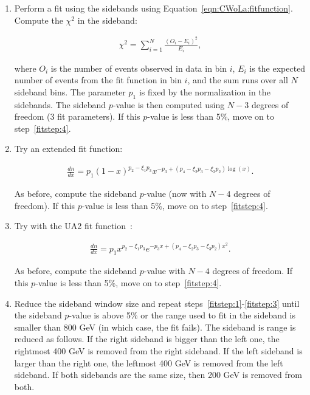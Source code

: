 \begin{enumerate}
  \item \label{fitstep:1} Perform a fit using the sidebands using Equation~\ref{eqn:CWoLa:fitfunction}.  Compute the $\chi^2$ in the sideband:

\begin{align}
\chi^2=\sum_{i=1}^N \frac{(O_i-E_i)^2}{E_i},
\end{align}

\noindent where $O_i$ is the number of events observed in data in bin $i$, $E_i$ is the expected number of events from the fit function in bin $i$, and the sum runs over all $N$ sideband bins.
The parameter $p_1$ is fixed by the normalization in the sidebands.
The sideband $p$-value is then computed using $N-3$ degrees of freedom (3 fit parameters).
If this $p$-value is less than 5\%, move on to step~\ref{fitstep:4}.
\item \label{fitstep:2} Try an extended fit function:

\begin{align}
\frac{dn}{dx}=p_1(1-x)^{p_2-\xi_1 p_3}x^{-p_3+(p_4-\xi_2p_3-\xi_3p_2)\log(x)}.
\end{align}

\noindent As before, compute the sideband $p$-value (now with $N-4$ degrees of freedom).
If this $p$-value is less than 5\%, move on to step~\ref{fitstep:4}.

\item \label{fitstep:3} Try with the UA2 fit function~\cite{Alitti:1990kw}:

\begin{align}
\frac{dn}{dx}=p_1x^{p_2-\xi_1 p_3}e^{-p_3x+(p_4-\xi_2p_3-\xi_3p_2)x^2}.
\end{align}

\noindent As before, compute the sideband $p$-value with $N-4$ degrees of freedom.
If this $p$-value is less than 5\%, move on to step~\ref{fitstep:4}.


\item Reduce the sideband window size and repeat steps~\ref{fitstep:1}-\ref{fitstep:3} until the sideband $p$-value is above 5\% or the range used to fit in the sideband is smaller than 800 GeV (in which case, the fit fails).  The sideband is range is reduced as follows.  If the right sideband is bigger than the left one, the rightmost 400 GeV is removed from the right sideband.  If the left sideband is larger than the right one, the leftmost 400 GeV is removed from the left sideband.  If both sidebands are the same size, then 200 GeV is removed from both.


\end{enumerate}
